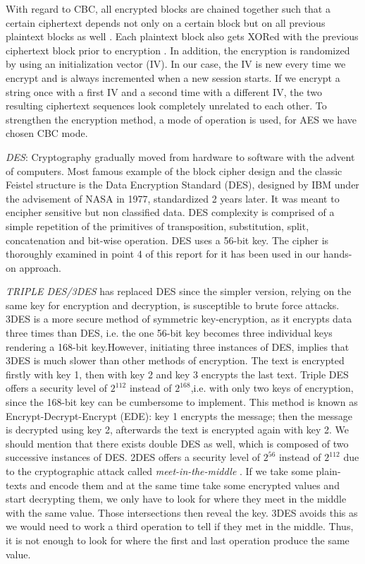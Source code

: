 With regard to CBC, all encrypted blocks are chained together such that a certain ciphertext depends not only on a certain block but on all previous plaintext blocks as well \cite{morris2001}. Each plaintext block also gets XORed with the previous ciphertext block prior to encryption \cite{morris2001}. In addition, the encryption is randomized by using an initialization vector (IV). In our case, the IV is new every time we encrypt and is always incremented when a new session starts. If we encrypt a string once with a first IV and a second time with a different IV, the two resulting ciphertext sequences look completely unrelated to each other. To strengthen the encryption method, a mode of operation is used, for AES we have chosen CBC mode. 

\textit{DES}: Cryptography gradually moved from hardware to software with the advent of computers. Most famous example of the block cipher design and the classic Feistel structure is the Data Encryption Standard (DES), designed by IBM under the advisement of NASA in 1977, standardized 2 years later. It was meant to encipher sensitive but non classified data. DES complexity is comprised of a simple repetition of the primitives of transposition, substitution, split, concatenation and bit-wise operation. DES uses a 56-bit key. The cipher is thoroughly examined in point 4 of this report for it has been used in our hands-on approach.

\textit{TRIPLE DES/3DES} has replaced DES since the simpler version, relying on the same key for encryption and decryption, is susceptible to brute force attacks. 3DES is a more secure method of symmetric key-encryption, as it encrypts data three times than DES, i.e. the one 56-bit key becomes three individual keys rendering a 168-bit key.However, initiating three instances of DES, implies that 3DES is much slower than other methods of encryption. The text is encrypted firstly with key 1, then with key 2 and key 3 encrypts the last text. Triple DES offers a security level of $2^{112}$ instead of $2^{168}$,i.e. with only two keys of encryption, since the 168-bit key can be cumbersome to implement. This method is known as Encrypt-Decrypt-Encrypt (EDE): key 1 encrypts the message; then the message is decrypted using key 2, afterwards the text is encrypted again with key 2. We should mention that there exists double DES as well, which is composed of two successive instances of DES. 2DES offers a security level of $2^{56}$ instead of $2^{112}$ due to the cryptographic attack called \emph{meet-in-the-middle} \cite{mitm}. If we take some plain-texts and encode them and at the same time take some encrypted values and start decrypting them, we only have to look for where they meet in the middle with the same value. Those intersections then reveal the key. 3DES avoids this as we would need to work a third operation to tell if they met in the middle. Thus, it is not enough to look for where the first and last operation produce the same value.

